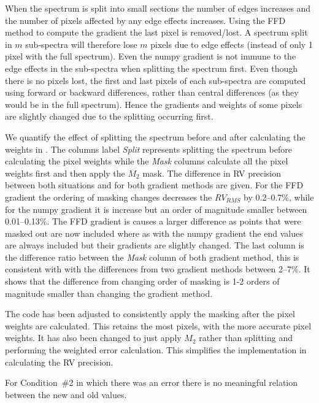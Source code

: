 When the spectrum is split into small sections the number of edges increases and the number of pixels affected by any edge effects increases. Using the {FFD} method to compute the gradient the last pixel is removed/lost. A spectrum split in \(m\) sub-spectra will therefore lose \(m\) pixels due to edge effects (instead of only 1 pixel with the full spectrum).
Even the numpy gradient is not immune to the edge effects in the sub-spectra when splitting the spectrum first. Even though there is no pixels lost, the first and last pixels of each sub-spectra are computed using forward or backward differences, rather than central differences (as they would be in the full spectrum). Hence the gradients and weights of some pixels are slightly changed due to the splitting occurring first.

We quantify the effect of splitting the spectrum before and after calculating the weights in . The columns label \emph{Split} represents splitting the spectrum before calculating the pixel weights while the \emph{Mask} columns calculate all the pixel weights first and then apply the \(M_2\) mask. The difference in {RV} precision between both situations and for both gradient methods are given.
For the {FFD} gradient the ordering of masking changes decreases the {\red{}\(RV_{RMS}\)} by 0.2--0.7\%, while for the numpy gradient it is increase but an order of magnitude smaller between 0.01--0.13\%.
The {FFD} gradient is causes a larger difference as points that were masked out are now included where as with the numpy gradient the end values are always included but their gradients are slightly changed.
The last column is the difference ratio between the \emph{Mask} column of both gradient method, this is consistent with  with the differences from two gradient methods between 2--7\%.
It shows that the difference from changing order of masking is 1-2 orders of magnitude smaller than changing the gradient method.

The code has been adjusted to consistently apply the masking after the pixel weights are calculated. This retains the most pixels, with the more accurate pixel weights. It has also been changed to just apply \(M_2\) rather than splitting and performing the weighted error calculation. This simplifies the implementation in calculating the {RV} precision.



{\red{} For Condition~\#2 in which there was an error there is no meaningful relation between the new and old values. }



